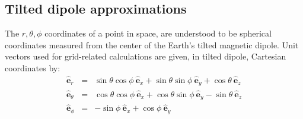 \documentclass[11pt,letterpaper]{article}
\begin{document}
\subsection{Tilted dipole approximations}

The $r,\theta,\phi$ coordinates of a point in space, are understood to be spherical coordinates measured from the center of the Earth's tilted magnetic dipole.  Unit vectors used for grid-related calculations are given, in tilted dipole, Cartesian coordinates by:  
\begin{eqnarray}
\hat{\mathbf{e}}_r &=& \sin \theta \cos \phi ~ \hat{\mathbf{e}}_x + \sin \theta \sin \phi ~ \hat{\mathbf{e}}_y + \cos \theta ~ \hat{\mathbf{e}}_z \\
\hat{\mathbf{e}}_\theta &=& \cos \theta \cos \phi ~ \hat{\mathbf{e}}_x + \cos \theta \sin \phi ~ \hat{\mathbf{e}}_y - \sin \theta ~ \hat{\mathbf{e}}_z \\
\hat{\mathbf{e}}_\phi &=& -\sin \phi ~ \hat{\mathbf{e}}_x + \cos \phi ~ \hat{\mathbf{e}}_y
\end{eqnarray}

\end{document}
